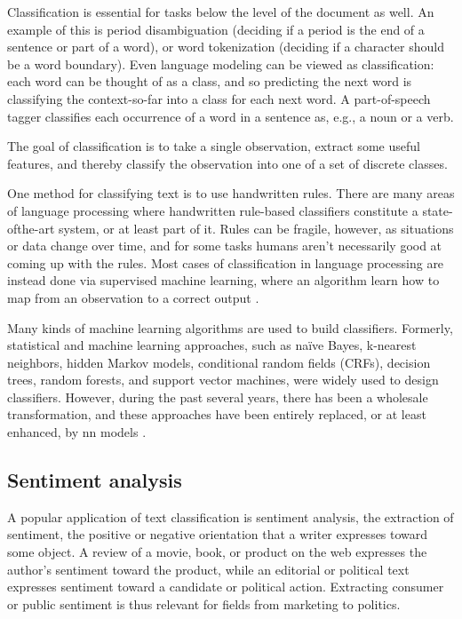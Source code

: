 Classification is essential for tasks below the level of the document as well.
An example of this is period disambiguation (deciding if a period is the end of a sentence or part of a word), or word tokenization (deciding if a character should be a word boundary). Even language modeling can be viewed as classification: each word can be thought of as a class, and so predicting the next word is classifying the context-so-far into a class for each next word. A part-of-speech tagger classifies each occurrence of a word in a sentence as, e.g., a noun or a verb.

The goal of classification is to take a single observation, extract some useful features, and thereby classify the observation into one of a set of discrete classes.

One method for classifying text is to use handwritten rules. There are many areas of language processing where handwritten rule-based classifiers constitute a state-ofthe-art system, or at least part of it. Rules can be fragile, however, as situations or data change over time, and for
some tasks humans aren't necessarily good at coming up with the rules. Most cases of classification in language processing are instead done via supervised machine learning, where an algorithm learn how to map from an observation to a correct output \cite{Jurafsky2009}.

Many kinds of machine learning algorithms are used to build classifiers.
Formerly, statistical and machine learning approaches, such as naïve Bayes, k-nearest neighbors, hidden Markov models, conditional random fields (CRFs), decision trees, random forests, and support vector machines, were widely used to design classifiers. 
However, during the past several years, there has been a wholesale transformation, and these approaches have been entirely replaced, or at least enhanced, by \gls{nn} models \cite{journals/corr/abs-1807-10854}. 

\subsection{Sentiment analysis}\label{subsec:sentiment-analysis}
A popular application of text classification is sentiment analysis, the extraction of sentiment, the positive or negative orientation that a writer expresses toward some object. A review of a movie, book, or product on the web expresses the author's sentiment toward the product, while an editorial or political text expresses sentiment toward a candidate or political action. Extracting consumer or public sentiment is thus relevant for fields from marketing to politics. 

